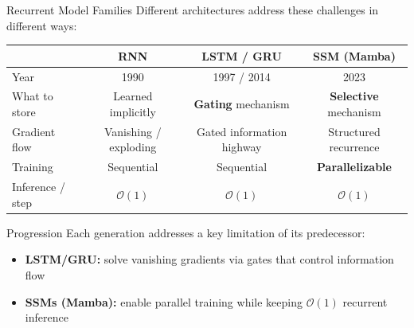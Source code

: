 \begin{frame}{Recurrent Model Families}
  Different architectures address these challenges in different ways:

  \vspace{0.5em}
  \begin{center}
  \renewcommand{\arraystretch}{1.3}
  \small
  \begin{tabular}{l c c c}
    \toprule
    & \textbf{RNN} & \textbf{LSTM / GRU} & \textbf{SSM (Mamba)} \\
    \midrule
    Year          & 1990 & 1997 / 2014 & 2023 \\
    What to store & Learned implicitly & \textbf{Gating} mechanism & \textbf{Selective} mechanism \\
    Gradient flow & Vanishing / exploding & Gated information highway & Structured recurrence \\
    Training      & Sequential & Sequential & \textbf{Parallelizable} \\
    Inference / step & $\mathcal{O}(1)$ & $\mathcal{O}(1)$ & $\mathcal{O}(1)$ \\
    \bottomrule
  \end{tabular}
  \end{center}

  \vspace{0.5em}
  \begin{block}{Progression}
    Each generation addresses a key limitation of its predecessor:
    \begin{itemize}
      \item \textbf{LSTM/GRU:} solve vanishing gradients via gates that control information flow
      \item \textbf{SSMs (Mamba):} enable parallel training while keeping $\mathcal{O}(1)$ recurrent inference
    \end{itemize}
  \end{block}
\end{frame}
